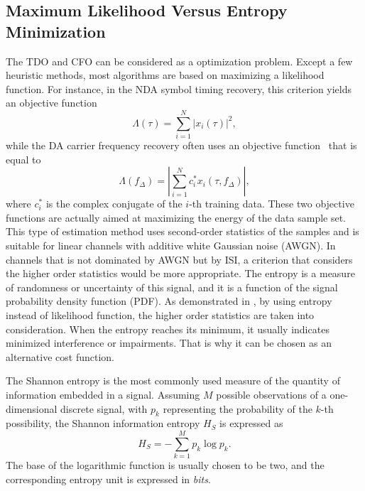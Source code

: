 \documentclass[journal,comsoc]{IEEEtran}
\begin{document}
\subsection{Maximum Likelihood Versus Entropy Minimization}
The TDO and CFO can be considered as a optimization problem.
Except a few heuristic methods, most algorithms are based on maximizing a likelihood function.
For instance, in the NDA symbol timing recovery, this criterion yields an objective function~\cite{mengali1997synchronization}
\begin{equation}
\Lambda(\tau) =\sum\limits_{i = 1}^N {{{\left| {{x_i}( \tau )} \right|}^2}}, 
\end{equation}
while the DA carrier frequency recovery often uses an objective function~\cite{mengali1997synchronization} that is equal to
\begin{equation}
\Lambda ({f_\Delta })=\left| \sum\limits_{i = 1}^N {{{{c_i^*{x_i}(\tau ,{f_\Delta })}}}} \right|, 
\end{equation}
where \(c_i^*\) is the complex conjugate of the \(i\)-th training data.
These two objective functions are actually aimed at maximizing the energy of the data sample set.
This type of estimation method uses second-order statistics of the samples and is suitable for linear channels with additive white Gaussian noise (AWGN).
In channels that is not dominated by AWGN but by ISI, a criterion that considers the higher order statistics would be more appropriate.
The entropy is a measure of randomness or uncertainty of this signal, and it is a function of the signal probability density function (PDF).
As demonstrated in \cite{Santamaria2002}, by using entropy instead of likelihood function, the higher order statistics are taken into consideration.
When the entropy reaches its minimum, it usually indicates minimized interference or impairments.
That is why it can be chosen as an alternative cost function.

The Shannon entropy is the most commonly used measure of the quantity of information  embedded in a signal.
Assuming \(M\) possible observations of a one-dimensional discrete signal, with \(p_k\) representing the probability of the \(k\)-th possibility, the Shannon information entropy \(H_S\) is expressed as \cite{Shannon1948}
\begin{equation}
H_S =  - \sum\limits_{k = 1}^M {{p_k}\log {p_k}}.
\label{eq:entropy}
\end{equation}
The base of the logarithmic function is usually chosen to be two, and the corresponding entropy unit is expressed in \textit{bits}.
\end{document}
